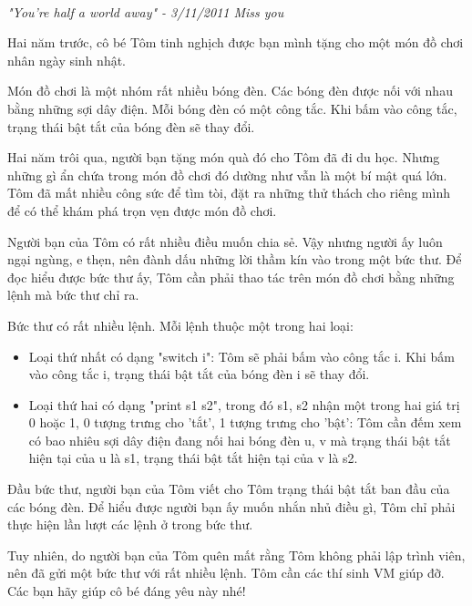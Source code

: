 

 

\emph{"You're half a world away" - 3/11/2011 Miss you }

Hai năm trước, cô bé Tôm tinh nghịch được bạn mình tặng cho một món đồ chơi nhân ngày sinh nhật.

Món đồ chơi là một nhóm rất nhiều bóng đèn. Các bóng đèn được nối với nhau bằng những sợi dây điện. Mỗi bóng đèn có một công tắc. Khi bấm vào công tắc, trạng thái bật tắt của bóng đèn sẽ thay đổi.

Hai năm trôi qua, người bạn tặng món quà đó cho Tôm đã đi du học. Nhưng những gì ẩn chứa trong món đồ chơi đó dường như vẫn là một bí mật quá lớn. Tôm đã mất nhiều công sức để tìm tòi, đặt ra những thử thách cho riêng mình để có thể khám phá trọn vẹn được món đồ chơi.

Người bạn của Tôm có rất nhiều điều muốn chia sẻ. Vậy nhưng người ấy luôn ngại ngùng, e thẹn, nên đành dấu những lời thầm kín vào trong một bức thư. Để đọc hiểu được bức thư ấy, Tôm cần phải thao tác trên món đồ chơi bằng những lệnh mà bức thư chỉ ra.

Bức thư có rất nhiều lệnh. Mỗi lệnh thuộc một trong hai loại:
\begin{itemize}
	\item Loại thứ nhất có dạng "switch i": Tôm sẽ phải bấm vào công tắc i. Khi bấm vào công tắc i, trạng thái bật tắt của bóng đèn i sẽ thay đổi.
	\item Loại thứ hai có dạng "print s1 s2", trong đó s1, s2 nhận một trong hai giá trị 0 hoặc 1, 0 tượng trưng cho 'tắt', 1 tượng trưng cho 'bật': Tôm cần đếm xem có bao nhiêu sợi dây điện đang nối hai bóng đèn u, v mà trạng thái bật tắt hiện tại của u là s1, trạng thái bật tắt hiện tại của v là s2.
\end{itemize}

Đầu bức thư, người bạn của Tôm viết cho Tôm trạng thái bật tắt ban đầu của các bóng đèn. Để hiểu được người bạn ấy muốn nhắn nhủ điều gì, Tôm chỉ phải thực hiện lần lượt các lệnh ở trong bức thư.

Tuy nhiên, do người bạn của Tôm quên mất rằng Tôm không phải lập trình viên, nên đã gửi một bức thư với rất nhiều lệnh. Tôm cần các thí sinh VM giúp đỡ. Các bạn hãy giúp cô bé đáng yêu này nhé!

